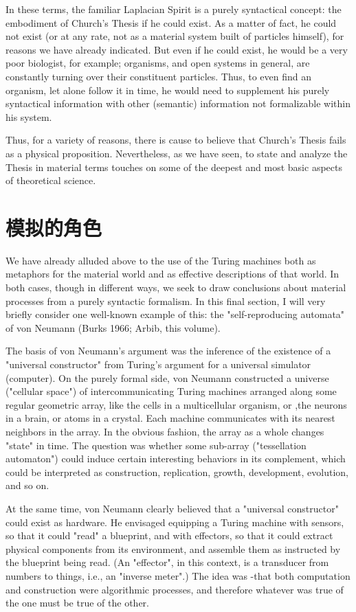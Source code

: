 \documentclass[a4paper,12pt]{article}
\begin{document}
In these terms, the familiar Laplacian Spirit is a purely syntactical concept: the embodiment of Church's Thesis if he could exist.  As a matter
of fact, he could not exist (or at any rate, not as a material system built of particles himself), for reasons we have already indicated.
But even if he could exist, he would be a very poor biologist, for example; organisms, and open systems in general, are constantly turning over their
constituent particles. Thus, to even find an organism, let alone follow it in time, he would need to supplement his purely syntactical
information with other (semantic) information not formalizable within his system.

Thus, for a variety of reasons, there is cause to believe that Church's Thesis fails as a physical proposition. Nevertheless,
as we have seen, to state and analyze the Thesis in material terms touches on some of the deepest and most basic aspects of theoretical science.

\section{模拟的角色}

We have already alluded above to the use of the Turing machines both
as metaphors for the material world and as effective descriptions of that
world.  In both cases, though in different ways, we seek to draw conclusions
about material processes from a purely syntactic formalism. In this final section,
I will very briefly consider one well-known example of this:
the "self-reproducing automata" of von Neumann (Burks 1966; Arbib, this volume).

The basis of von Neumann's argument was the inference of the existence of a "universal constructor" from Turing's
argument for a universal simulator (computer).  On the purely formal side, von Neumann constructed
a universe ("cellular space") of intercommunicating Turing machines arranged along some regular geometric array,
like the cells in a multicellular organism, or ,the neurons in a brain, or atoms in a crystal. Each machine
communicates with its nearest neighbors in the array. In the obvious fashion, the array as a whole changes "state" in time.
The question was whether some sub-array ("tessellation automaton") could induce certain interesting behaviors in its complement,
which could be interpreted as construction, replication, growth, development, evolution, and so on.

At the same time, von Neumann clearly believed that a "universal constructor" could exist as hardware. He envisaged equipping a Turing machine
with sensors, so that it could "read" a blueprint, and with effectors,
so that it could extract physical components from its environment, and
assemble them as instructed by the blueprint being read. (An "effector",
in this context, is a transducer from numbers to things, i.e., an "inverse
meter".) The idea was -that both computation and construction were algorithmic processes,
and therefore whatever was true of the one must be true
of the other.
\end{document}
